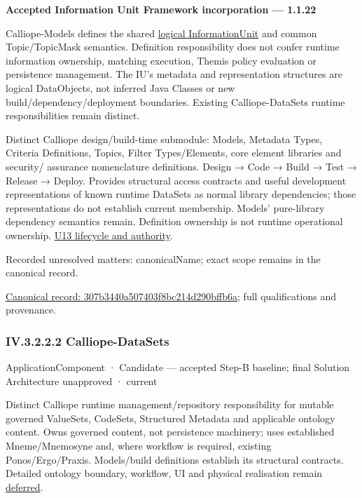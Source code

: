 \par\medskip\textbf{Accepted Information Unit Framework incorporation — 1.1.22}\par


Calliope-Models defines the shared \hyperref[element:74ec609de1ae498fbf9d13e4ef8c6cbe]{logical InformationUnit} and common Topic/TopicMask semantics. Definition responsibility does not confer runtime information ownership, matching execution, Themis policy evaluation or persistence management. The IU's metadata and representation structures are logical DataObjects, not inferred Java Classes or new build/dependency/deployment boundaries. Existing Calliope-DataSets runtime responsibilities remain distinct.



Distinct Calliope design/build-time submodule: Models, Metadata Types, Criteria
Definitions, Topics, Filter Types/Elements, core element libraries and security/
assurance nomenclature definitions. Design → Code → Build → Test → Release → Deploy.
Provides structural access contracts and useful development representations of
known runtime DataSets as normal library dependencies; those representations do
not establish current membership. Models' pure-library dependency semantics remain.
Definition ownership is not runtime operational ownership. \hyperref[element:307b3440a507403f8bc214d290bffb6a]{U13 lifecycle and authority}.


{\small Recorded unresolved matters: canonicalName; exact scope remains in the canonical record.}\par
{\footnotesize \href{../../../../continuum/application/application-component/307b3440a507403f8bc214d290bffb6a.md}{Canonical record: 307b3440a507403f8bc214d290bffb6a}; full qualifications and provenance.}\par
\subsubsection*{IV.3.2.2.2 Calliope-DataSets}
\label{navigation:IV.3.2.2.2}

\label{element:53bf6815c7a54ed0abde9b1aad311843}
{\small ApplicationComponent · Candidate — accepted Step-B baseline; final Solution Architecture unapproved · current}\par

Distinct Calliope runtime management/repository responsibility for mutable governed
ValueSets, CodeSets, Structured Metadata and applicable ontology content. Owns
governed content, not persistence machinery; uses established Mneme/Mnemosyne and,
where workflow is required, existing Ponos/Ergo/Praxis. Models/build definitions
establish its structural contracts. Detailed ontology boundary, workflow, UI and
physical realisation remain \hyperref[element:466ad8f75a954c0581b5bba090443849]{deferred}.


